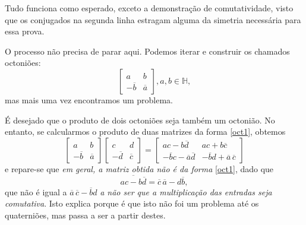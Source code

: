 \documentclass{article}
\renewcommand{\H}{\mathbb{H}}
\begin{document}
Tudo funciona como esperado, exceto a demonstração de comutatividade, visto que os conjugados na segunda linha estragam alguma da simetria necessária para essa prova.

O processo não precisa de parar aqui. Podemos iterar e construir os chamados octoniões:
\begin{equation}\label{oct1}
\begin{bmatrix} a & b \\ -\overline{b} & \overline{a} \end{bmatrix}, a, b \in \H,
\end{equation}
mas mais uma vez encontramos um problema.

É desejado que o produto de dois octoniões seja também um octonião. No entanto, se calcularmos o produto de duas matrizes da forma \eqref{oct1}, obtemos
\[\begin{bmatrix} a & b \\ -\overline{b} & \overline{a} \end{bmatrix} \begin{bmatrix} c & d \\ -\overline{d} & \overline{c} \end{bmatrix} = \begin{bmatrix} ac - b \overline{d} & ac + b \overline{c} \\ -\overline{b}c - \overline{a} \overline{d} & -\overline{b} d + \overline{a} \, \overline{c} \end{bmatrix}\]
e repare-se que \emph{em geral, a matriz obtida não é da forma} \eqref{oct1}, dado que
\[\overline{ac - b\overline{d}} = \overline{c} \, \overline{a} - d \overline{b},\]
que não é igual a $\overline{a}\,\overline{c} - \overline{b} d$ \emph{a não ser que a multiplicação das entradas seja comutativa}. Isto explica porque é que isto não foi um problema até os quaterniões, mas passa a ser a partir destes.
\end{document}
